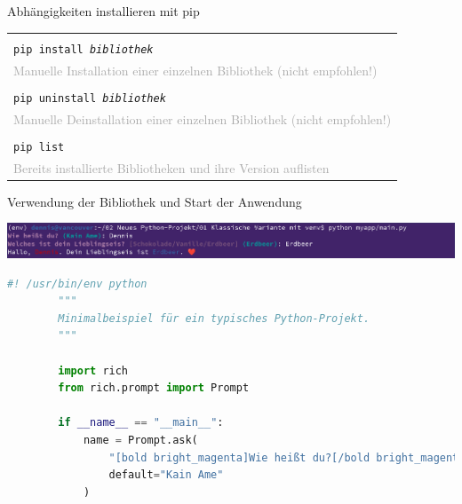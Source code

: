 {{\begin{frame}[fragile]{Abhängigkeiten installieren mit pip}
{\begin{tabular}{|p{}|}
        \cellcolor{gray!7}
        \\

        \cellcolor{gray!15}
        \texttt{pip install \textit{bibliothek}} \\
        \cellcolor{gray!15}
        \textcolor{darkgray}{Manuelle Installation einer einzelnen Bibliothek (nicht empfohlen!)} \\

        \cellcolor{gray!7}
        \\

        \cellcolor{gray!15}
        \texttt{pip uninstall \textit{bibliothek}} \\
        \cellcolor{gray!15}
        \textcolor{darkgray}{Manuelle Deinstallation einer einzelnen Bibliothek (nicht empfohlen!)} \\

        \cellcolor{gray!7}
        \\

        \cellcolor{gray!15}
        \texttt{pip list} \\
        \cellcolor{gray!15}
        \textcolor{darkgray}{Bereits installierte Bibliotheken und ihre Version auflisten} \\

        \hline
    \end{tabular}
    }
\end{frame}
}

{
\tiny

\begin{frame}[fragile]{Verwendung der Bibliothek und Start der Anwendung}

    \includegraphics[width=\textwidth]{img/venv-ausfuehren}

    \begin{lstlisting}[language=Python, gobble=8]
        #! /usr/bin/env python
        """
        Minimalbeispiel für ein typisches Python-Projekt.
        """

        import rich
        from rich.prompt import Prompt

        if __name__ == "__main__":
            name = Prompt.ask(
                "[bold bright_magenta]Wie heißt du?[/bold bright_magenta]",
                default="Kain Ame"
            )


\end{lstlisting}
\end{frame}}}
